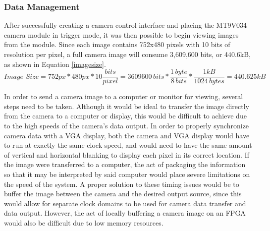 \subsubsection{Data Management}
After successfully creating a camera control interface and placing the MT9V034 camera module in trigger mode, it was then possible to begin viewing images from the module. Since each image contains 752x480 pixels with 10 bits of resolution per pixel, a full camera image will consume 3,609,600 bits, or 440.6kB, as shown in Equation \ref{imagesize}.
\begin{equation} \label{imagesize}
Image\,\,Size = 752px*480px*10\frac{bits}{pixel} = 3609600\,bits*\frac{1\,byte}{8\,bits}*\frac{1 kB}{1024\,bytes} = 440.625kB
\end{equation}
\par
In order to send a camera image to a computer or monitor for viewing, several steps need to be taken. Although it would be ideal to transfer the image directly from the camera to a computer or display, this would be difficult to achieve due to the high speeds of the camera's data output. In order to properly synchronize camera data with a VGA display, both the camera and VGA display would have to run at exactly the same clock speed, and would need to have the same amount of vertical and horizontal blanking to display each pixel in its correct location. If the image were transferred to a computer, the act of packaging the information so that it may be interpreted by said computer would place severe limitations on the speed of the system. A proper solution to these timing issues would be to buffer the image between the camera and the desired output source, since this would allow for separate clock domains to be used for camera data transfer and data output. However, the act of locally buffering a camera image on an FPGA would also be difficult due to low memory resources. 
\par
